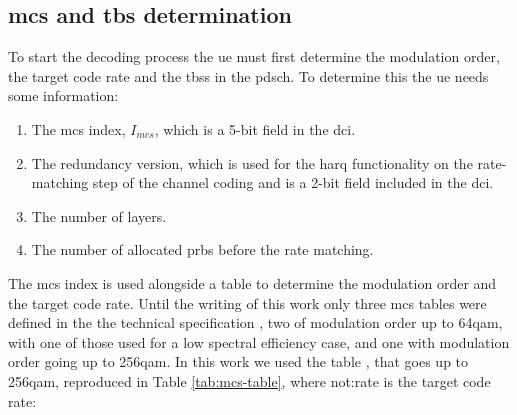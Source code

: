\subsection{\Acl{mcs} and \acl{tbs} determination}

To start the decoding process the \gls{ue} must first determine the modulation order, the target code rate and the \glspl{tbs} in the \gls{pdsch}.
%
To determine this the \gls{ue} needs some information:

\begin{enumerate}
    \item The \gls{mcs} index, $I_{mcs}$, which is a 5-bit field in the \gls{dci}.
    \item The redundancy version, which is used for the \gls{harq} functionality on the rate-matching step of the channel coding and is a 2-bit field included in the \gls{dci}.
    \item The number of layers.
    \item The number of allocated \glspl{prb} before the rate matching.
\end{enumerate}

The \gls{mcs} index is used alongside a table to determine the modulation order and the target code rate.
%
Until the writing of this work only three \gls{mcs} tables were defined in the the technical specification \cite{3gpp.38.214}, two of modulation order up to 64\gls{qam}, with one of those used for a low spectral efficiency case, and one with modulation order going up to 256\gls{qam}.
%
In this work we used the table \cite[Table 5.1.3.1-2]{3gpp.38.214}, that goes up to 256\gls{qam}, reproduced in Table \ref{tab:mcs-table}, where \gls{not:rate} is the target code rate:

